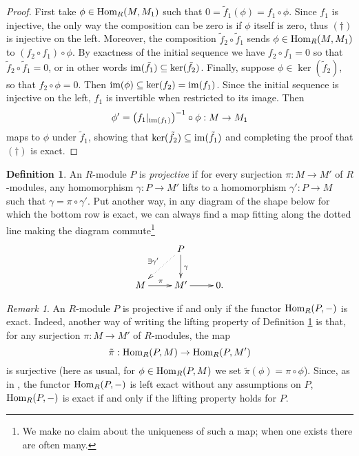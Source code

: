 \documentclass[11pt]{amsart}
\numberwithin{equation}{section}
\theoremstyle{remark}
\newtheorem{remark}[equation]{Remark}
\theoremstyle{remark}
\theoremstyle{remark}
\theoremstyle{definition}
\theoremstyle{definition}
\theoremstyle{definition}
\newtheorem{defi}[equation]{Definition}
\theoremstyle{definition}
\theoremstyle{definition}
\theoremstyle{definition}
\begin{document}
\begin{proof}
First take $\phi \in \textup{Hom}_R(M,M_1)$ such that $0=\tilde{f}_1(\phi)=f_1\circ \phi$. Since $f_1$ is injective, the only way the composition can be zero is if $\phi$ itself is zero, thus $ (\dagger)$ is injective on the left. Moreover, the composition $\tilde{f}_2\circ \tilde{f}_1$ sends $\phi\in \textup{Hom}_R(M,M_1)$ to $ (f_2\circ f_1)\circ \phi$. By exactness of the initial sequence we have $f_2\circ f_1=0$ so that $\tilde{f}_2\circ \tilde{f}_1=0$, or in other words $\textup{im}(\tilde{f}_1)\subseteq \ker(\tilde{f}_2)$. Finally, suppose $\phi \in \ker(\tilde{f}_2)$, so that $f_2 \circ\phi =0$. Then $\textup{im}(\phi)\subseteq \ker(f_2)=\textup{im}(f_1)$. Since the initial sequence is injective on the left, $f_1$ is invertible when restricted to its image. Then
\[\phi'=\left(f_1|_{\textup{im}(f_1)}\right)^{-1}\circ \phi:M\rightarrow M_1\] maps to $\phi$ under $\tilde{f}_1$, showing that $\ker(\tilde{f}_2)\subseteq \textup{im}(\tilde{f}_1)$ and completing the proof that $(\dagger)$ is exact.
\end{proof}

\begin{defi} \label{proj defi}
An $R$-module $P$ is \textit{projective} if for every surjection $\pi:M\rightarrow M'$ of $R$-modules, any homomorphism $\gamma:P\rightarrow M'$ lifts to a homomorphism $\gamma':P\rightarrow M$ such that $\gamma=\pi\circ \gamma'$. Put another way, in any diagram of the shape below for which the bottom row is exact, we can always find a map fitting along the dotted line making the diagram commute\footnote{We make no claim about the uniqueness of such a map; when one exists there are often many.}
\[
\xymatrix{&P\ar[d]^\gamma\ar@{..>}[dl]_{\exists \gamma'}& \\M\ar[r]^\pi&
M'\ar[r] & 0.
}
\]
\end{defi}

\begin{remark}
An $R$-module $P$ is projective if and only if the functor $\textup{Hom}_R(P,-)$ is exact. Indeed, another way of writing the lifting property of Definition \ref{proj defi} is that, for any surjection $\pi:M\rightarrow M'$ of $R$-modules, the map
\[\tilde{\pi}:\textup{Hom}_R(P,M)\rightarrow \textup{Hom}_R(P,M')\]
is surjective (here as usual, for $\phi \in\textup{Hom}_R(P,M)$  we set $\tilde{\pi}(\phi)=\pi\circ \phi$). Since, as in , the functor $\textup{Hom}_R(P,-)$ is left exact without any assumptions on $P$, $\textup{Hom}_R(P,-)$ is exact if and only if the lifting property holds for $P$.
\end{remark}
\end{document}
